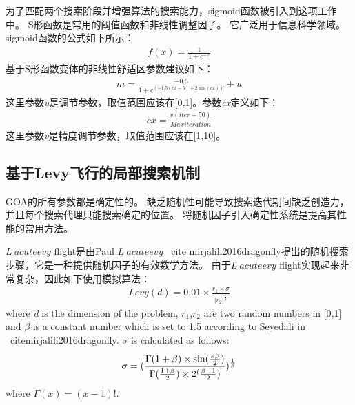 为了匹配两个搜索阶段并增强算法的搜索能力，sigmoid函数被引入到这项工作中。 S形函数是常用的阈值函数和非线性调整因子。 它广泛用于信息科学领域。 sigmoid函数的公式如下所示：
\begin{eqnarray}
	f(x)=\frac{1}{1+e^{-x}}
\end{eqnarray}
基于S形函数变体的非线性舒适区参数建议如下：
\begin{eqnarray}
    m=\frac{-0.5}{1+e^{(-1.5(cx-5)+2\sin(cx))}}+u
\end{eqnarray}
这里参数\emph{u}是调节参数，取值范围应该在[0,1]。参数\emph{cx}定义如下：
\begin{eqnarray}
	cx=\frac{v(iter+50)}{Maxiteration}
\end{eqnarray}
这里参数\emph{v}是精度调节参数，取值范围应该在[1,10]。
\subsection{基于Levy飞行的局部搜索机制}
GOA的所有参数都是确定性的。 缺乏随机性可能导致搜索迭代期间缺乏创造力，并且每个搜索代理只能搜索确定的位置。 将随机因子引入确定性系统是提高其性能的常用方法。

$ L \ acute {e} vy $ flight是由Paul $ L \ acute {e} vy $ \ cite {mirjalili2016dragonfly}提出的随机搜索步骤，它是一种提供随机因子的有效数学方法。 由于$ L \ acute {e} vy $ flight实现起来非常复杂，因此如下使用模拟算法：
\begin{eqnarray}
	Levy(d)=0.01\times\frac{r_1\times\sigma}{|r_2|^{\frac{1}{\beta}}}
\end{eqnarray}
where \emph{d} is the dimension of the problem, $r_1$,$r_2$ are two random numbers in [0,1] and $\beta$ is a constant number which is set to 1.5 according to Seyedali in \ cite{mirjalili2016dragonfly}. $\sigma$ is calculated as follows:
\begin{eqnarray}
	\sigma=(\frac{\Gamma(1+\beta)\times \sin(\frac{\pi\beta}{2})}{\Gamma(\frac{1+\beta}{2})\time\beta\times2^(\frac{\beta-1}{2})})^\frac{1}{\beta}
\end{eqnarray}
where $\Gamma(x)=(x-1)!$.

